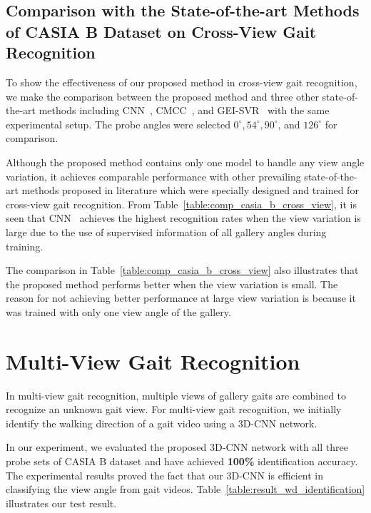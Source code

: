 \subsection{Comparison with the State-of-the-art Methods of CASIA B Dataset on Cross-View Gait Recognition}
To show the effectiveness of our proposed method in cross-view gait recognition, we make the comparison between the proposed method and three other state-of-the-art methods including CNN~\cite{Wu_17}, CMCC~\cite{Kusakunniran_14}, and GEI-SVR~\cite{Kusakunniran_10} with the same experimental setup. The probe angles were selected $0^{\circ}, 54^{\circ}, 90^{\circ}$, and $126^{\circ}$ for comparison. 

Although the proposed method contains only one model to handle any view angle variation, it achieves comparable performance with other prevailing state-of-the-art methods proposed in literature which were specially designed and trained for cross-view gait recognition. From Table~\ref{table:comp_casia_b_cross_view}, it is seen that CNN~\cite{Wu_17} achieves the highest recognition rates when the view variation is large due to the use of supervised information of all gallery angles during training.

The comparison in Table~\ref{table:comp_casia_b_cross_view} also illustrates that the proposed method performs better when the view variation is small. The reason for not achieving better performance at large view variation is because it was trained with only one view angle of the gallery. 



\section{Multi-View Gait Recognition} \label{sec:multi_view}
In multi-view gait recognition, multiple views of gallery gaits are combined to recognize an unknown gait view. For multi-view gait recognition, we initially identify the walking direction of a gait video using a 3D-CNN network. 

In our experiment, we evaluated the proposed 3D-CNN network with all three probe sets of CASIA B dataset and have achieved \textbf{100\%} identification accuracy. The experimental results proved the fact that our 3D-CNN is efficient in classifying the view angle from gait videos. Table~\ref{table:result_wd_identification} illustrates our test result. 

